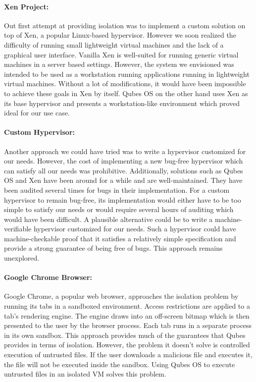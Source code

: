 \paragraph{Xen Project:} Out first attempt at providing isolation was to implement a custom solution on top of Xen, a popular Linux-based hypervisor. However we soon realized the difficulty of running small lightweight virtual machines and the lack of a graphical user interface. Vanilla Xen is well-suited for running generic virtual machines in a server based settings. However, the system we envisioned was intended to be used as a workstation running applications running in lightweight virtual machines. Without a lot of modifications, it would have been impossible to achieve these goals in Xen by itself. Qubes OS on the other hand uses Xen as its base hypervisor and presents a workstation-like environment which proved ideal for our use case.

\paragraph{Custom Hypervisor:} Another approach we could have tried was to write a hypervisor customized for our needs. However, the cost of implementing a new bug-free hypervisor which can satisfy all our needs was prohibitive. Additionally, solutions such as Qubes OS and Xen have been around for a while and are well-maintained. They have been audited several times for bugs in their implementation. For a custom hypervisor to remain bug-free, its implementation would either have to be too simple to satisfy our needs or would require several hours of auditing which would have been difficult. A plausible alternative could be to write a machine-verifiable hypervisor customized for our needs. Such a hypervisor could have machine-checkable proof that it satisfies a relatively simple specification and provide a strong guarantee of being free of bugs. This approach remains unexplored.

\paragraph{Google Chrome Browser:} Google Chrome, a popular web browser, approaches the isolation problem by running its tabs in a sandboxed environment. Access restrictions are applied to a tab's rendering engine. The engine draws into an off-screen bitmap which is then presented to the user by the browser process. Each tab runs in a separate process in its own sandbox. This approach provides much of the guarantees that Qubes provides in terms of isolation. However, the problem it doesn't solve is controlled execution of untrusted files. If the user downloads a malicious file and executes it, the file will not be executed inside the sandbox. Using Qubes OS to execute untrusted files in an isolated VM solves this problem.

